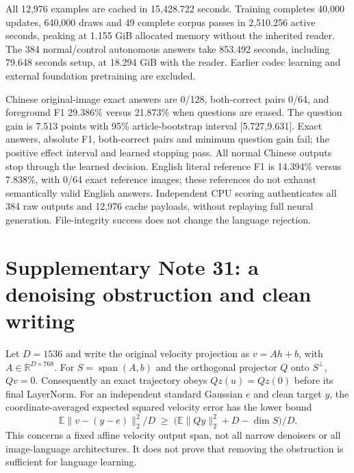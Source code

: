 \documentclass[10pt,a4paper]{article}
\begin{document}
All 12,976 examples are cached in 15,428.722 seconds. Training completes
40,000 updates, 640,000 draws and 49 complete corpus passes in 2,510.256
active seconds, peaking at 1.155 GiB allocated memory without the inherited
reader. The 384 normal/control autonomous answers take 853.492 seconds,
including 79.648 seconds setup, at 18.294 GiB with the reader. Earlier
codec learning and external foundation pretraining are excluded.

Chinese original-image exact answers are 0/128, both-correct pairs 0/64,
and foreground F1 29.386\% versus 21.873\% when questions are erased.
The question gain is 7.513 points with 95\% article-bootstrap interval
[5.727,9.631]. Exact answers, absolute F1, both-correct pairs and minimum
question gain fail; the positive effect interval and learned stopping pass.
All normal Chinese outputs stop through the learned decision. English literal
reference F1 is 14.394\% versus 7.838\%, with 0/64 exact reference images;
these references do not exhaust semantically valid English answers.
Independent CPU scoring authenticates all 384 raw outputs and 12,976 cache
payloads, without replaying full neural generation. File-integrity success
does not change the language rejection.


\section*{Supplementary Note 31: a denoising obstruction and clean writing}
Let $D=1536$ and write the original velocity projection as $v=Ah+b$, with
$A\in\mathbb R^{D\times768}$. For $S=\operatorname{span}(A,b)$ and the
orthogonal projector $Q$ onto $S^\perp$, $Qv=0$. Consequently an exact
trajectory obeys $Qz(u)=Qz(0)$ before its final LayerNorm. For an independent
standard Gaussian $e$ and clean target $y$, the coordinate-averaged expected
squared velocity error has the lower bound
\begin{equation}
 \mathbb E\|v-(y-e)\|_2^2/D
 \;\geq\; \bigl(\mathbb E\|Qy\|_2^2+D-\dim S\bigr)/D.
\end{equation}
This concerns a fixed affine velocity output span, not all narrow denoisers
or all image-language architectures. It does not prove that removing the
obstruction is sufficient for language learning.
\end{document}
